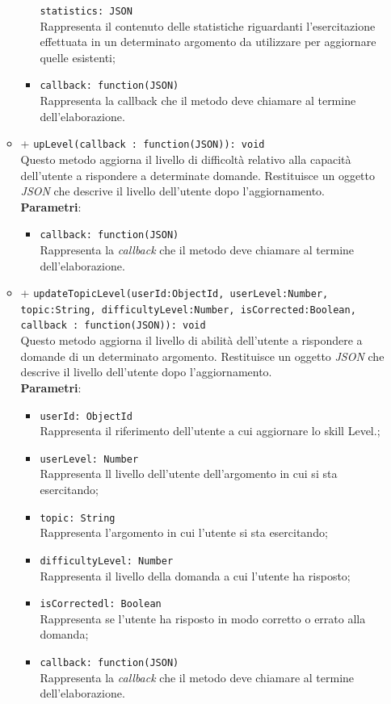 \begin{itemize}
\begin{itemize}
\begin{itemize}
				\texttt{statistics: JSON} \\
				Rappresenta il contenuto delle statistiche riguardanti l'esercitazione effettuata in un determinato argomento da utilizzare per aggiornare quelle esistenti;
			\item	
				\texttt{callback: function(JSON)} \\
				Rappresenta la callback che il metodo deve chiamare al termine dell'elaborazione.
			\end{itemize}
		\item		
		+ \texttt{upLevel(callback : function(JSON)): void} \\
		Questo metodo aggiorna il livello di difficoltà relativo alla capacità dell'utente a rispondere a determinate domande. Restituisce un oggetto \textit{JSON} che descrive il livello dell'utente dopo l'aggiornamento.	\\	
		\textbf{Parametri}: 
			\begin{itemize}
			\item	
				\texttt{callback: function(JSON)} \\
				Rappresenta la \textit{callback} che il metodo deve chiamare al termine dell'elaborazione.		
			\end{itemize}
		\item		
			+ \texttt{updateTopicLevel(userId:ObjectId, userLevel:Number, topic:String, difficultyLevel:Number, isCorrected:Boolean, callback : function(JSON)): void} \\
			Questo metodo aggiorna il livello di abilità dell'utente a rispondere a domande di un determinato argomento. Restituisce un oggetto \textit{JSON} che descrive il livello dell'utente dopo l'aggiornamento.	\\	
			\textbf{Parametri}: 
			\begin{itemize}
				\item	
					\texttt{userId: ObjectId} \\
					Rappresenta il riferimento dell'utente a cui aggiornare lo skill Level.;	
				\item	
					\texttt{userLevel: Number} \\
					Rappresenta ll livello dell'utente dell'argomento in cui si sta esercitando;		
				\item	
					\texttt{topic: String} \\
					Rappresenta l'argomento in cui l'utente si sta esercitando;
				\item	
					\texttt{difficultyLevel: Number} \\
					Rappresenta il livello della domanda a cui l'utente ha risposto;
				\item	
					\texttt{isCorrectedl: Boolean} \\
					Rappresenta se l'utente ha risposto in modo corretto o errato  alla domanda;
				\item	
					\texttt{callback: function(JSON)} \\
					Rappresenta la \textit{callback} che il metodo deve chiamare al termine dell'elaborazione.		
			\end{itemize}
			

\end{itemize}
\end{itemize}
